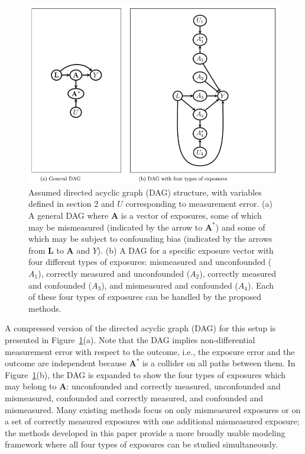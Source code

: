 \documentclass[useAMS,usenatbib,referee]{biom}
\begin{document}
\begin{figure}
\centering
\includegraphics[width=6in]{Paper1_Fig1.png}
\caption{Assumed directed acyclic graph (DAG) structure, with variables defined in section 2 and $U$ corresponding to measurement error. (a) A general DAG where $\bm{A}$ is a vector of exposures, some of which may be mismeasured (indicated by the arrow to $\bm{A}^{*}$) and some of which may be subject to confounding bias (indicated by the arrows from $\bm{L}$ to $\bm{A}$ and $Y$). (b) A DAG for a specific exposure vector with four different types of exposures: mismeasured and unconfounded ($A_{1}$), correctly measured and unconfounded ($A_{2}$), correctly measured and confounded ($A_{3}$), and mismeasured and confounded ($A_{4}$). Each of these four types of exposures can be handled by the proposed methods.}
\label{fig:one}
\end{figure}

A compressed version of the directed acyclic graph (DAG) for this setup is presented in Figure~\ref{fig:one}(a). Note that the DAG implies non-differential measurement error with respect to the outcome, i.e., the exposure error and the outcome are independent because $\bm{A}^{*}$ is a collider on all paths between them. In Figure~\ref{fig:one}(b), the DAG is expanded to show the four types of exposures which may belong to $\bm{A}$: unconfounded and correctly measured, unconfounded and mismeasured, confounded and correctly measured, and confounded and mismeasured. Many existing methods focus on only mismeasured exposures or on a set of correctly measured exposures with one additional mismeasured exposure; the methods developed in this paper provide a more broadly usable modeling framework where all four types of exposures can be studied simultaneously.
\end{document}

